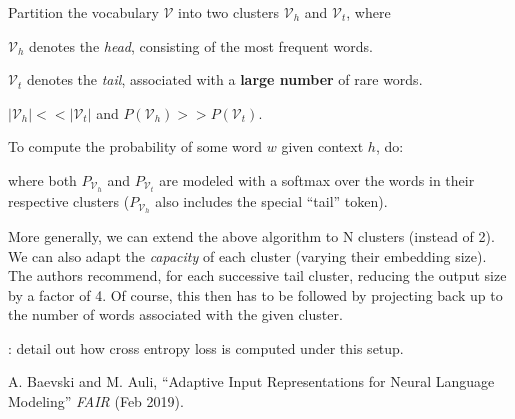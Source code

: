 \documentclass[11pt]{article}
\begin{document}
\begin{algorithm}
	Partition the vocabulary $\mathcal V$ into two clusters $\mathcal{V}_h$ and $\mathcal V_t$, where
	\begin{compactitem}
		\item $\mathcal V_h$ denotes the \textit{head}, consisting of the most frequent words.
		
		\item $\mathcal V_t$ denotes the \textit{tail}, associated with a \textbf{large number} of rare words.
		
		\item $|\mathcal V_h | << |\mathcal V_t|$ and $P(\mathcal V_h) >> P(\mathcal V_t)$.  
	\end{compactitem}
	
	To compute the probability of some word $w$ given context $h$, do:
	
	where both $P_{\mathcal V_h}$ and $P_{\mathcal V_t}$ are modeled with a softmax over the words in their respective clusters ($P_{\mathcal V_h}$ also includes the special ``tail'' token). 
	
\end{algorithm}

More generally, we can extend the above algorithm to N clusters (instead of 2). We can also adapt the \textit{capacity} of each cluster (varying their embedding size). The authors recommend, for each successive tail cluster, reducing the output size by a factor of 4. Of course, this then has to be followed by projecting back up to the number of words associated with the given cluster.

: detail out how cross entropy loss is computed under this setup.







\vspace{-1em}
{\footnotesize A. Baevski and M. Auli, ``Adaptive Input Representations for Neural Language Modeling'' \textit{FAIR} (Feb 2019).}
\end{document}
